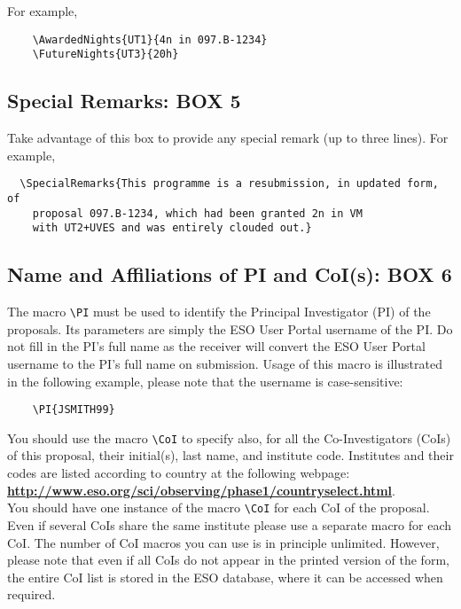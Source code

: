 \documentclass{article}
\begin{document}
For example,
\begin{verbatim}
    \AwardedNights{UT1}{4n in 097.B-1234}
    \FutureNights{UT3}{20h}
\end{verbatim} 

\subsection{Special Remarks:  {\bf BOX 5}}

Take advantage of this box to provide any special remark (up to three
lines).  For example,
\begin{verbatim}
  \SpecialRemarks{This programme is a resubmission, in updated form, of
    proposal 097.B-1234, which had been granted 2n in VM
    with UT2+UVES and was entirely clouded out.}
\end{verbatim}

\subsection{Name and Affiliations of PI and CoI(s): {\bf BOX 6}}

The macro \verb|\PI| must be used to identify the Principal
Investigator (PI) of the proposals. Its parameters are simply the 
ESO User Portal username of the PI. Do not fill in the PI's full
name as the receiver will convert the ESO User Portal username
to the PI's full name on submission.
Usage of this macro is illustrated in the following example, please note that the username is case-sensitive:
\begin{verbatim}
    \PI{JSMITH99}
\end{verbatim}

You should use the macro \verb|\CoI| to specify also, for
all the Co-Investigators (CoIs) of this proposal, their initial(s),
last name, and institute code. Institutes and their codes are listed 
according to country at the following webpage:\\
\href{http://www.eso.org/sci/observing/phase1/countryselect.html}
{\bf\underline{http://www.eso.org/sci/observing/phase1/countryselect.html}}.\\
You should have one instance of the macro \verb|\CoI| for each CoI of the
proposal. Even if several CoIs share the same institute
please use a separate macro for each CoI. The number of CoI macros you can 
use is in principle unlimited. However, please note that 
even if all CoIs do not appear in the printed version of the form,
the entire  CoI list is stored in the ESO database, where it
can be accessed when required.
\end{document}
